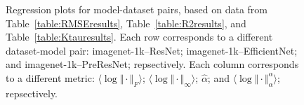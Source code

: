 \begin{figure}[t]
{        \label{fig:summary_regressions_A_10}
    }
    \caption{Regression plots for model-dataset pairs, based on data from Table~\ref{table:RMSEresults}, Table~\ref{table:R2results}, and Table~\ref{table:Ktauresults}.
             Each row corresponds to a different dataset-model pair:
             imagenet-1k--ResNet; 
             imagenet-1k--EfficientNet; 
             and 
             imagenet-1k--PreResNet; 
             repsectively.
             Each column corresponds to a different metric:
             $\langle\log\Vert\cdot\Vert_{F}\rangle$; 
             $\langle\log\Vert\cdot\Vert_{\infty}\rangle$; 
             $\hat{\alpha}$; 
             and
             $\langle\log\Vert\cdot\Vert^{\alpha}_{\alpha}\rangle$;
             repsectively.
            }
    \label{fig:summary_regressions_A}
\end{figure}

